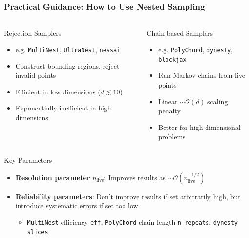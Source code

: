 \documentclass[aspectratio=169]{beamer}
\begin{document}
\begin{frame}
    \frametitle{Practical Guidance: How to Use Nested Sampling}
    \framesubtitle{}
    \vspace{-1em}
    \begin{columns}[T]
        \begin{block}{Rejection Samplers}
            \begin{itemize}
                \item e.g. \texttt{MultiNest}, \texttt{UltraNest}, \texttt{nessai}
                \item Construct bounding regions, reject invalid points
                \item Efficient in low dimensions ($d \lesssim 10$)
                \item Exponentially inefficient in high dimensions
            \end{itemize}
        \end{block}
        \begin{block}{Chain-based Samplers}
            \begin{itemize}
                \item e.g. \texttt{PolyChord}, \texttt{dynesty}, \texttt{blackjax}
                \item Run Markov chains from live points
                \item Linear $\sim\mathcal{O}(d)$ scaling penalty
                \item Better for high-dimensional problems
            \end{itemize}
        \end{block}
    \end{columns}
    \vspace{5pt}
    \begin{alertblock}{Key Parameters}
        \begin{itemize}
            \item \textbf{Resolution parameter} $n_{\text{live}}$: Improves results as $\sim\mathcal{O}(n_{\text{live}}^{-1/2})$
            \item \textbf{Reliability parameters}: Don't improve results if set arbitrarily high, but introduce systematic errors if set too low
                \begin{itemize}
                    \item \texttt{MultiNest} efficiency \texttt{eff}, \texttt{PolyChord} chain length \texttt{n\_repeats}, \texttt{dynesty} \texttt{slices}
                \end{itemize}
        \end{itemize}
    \end{alertblock}
\end{frame}
\end{document}
